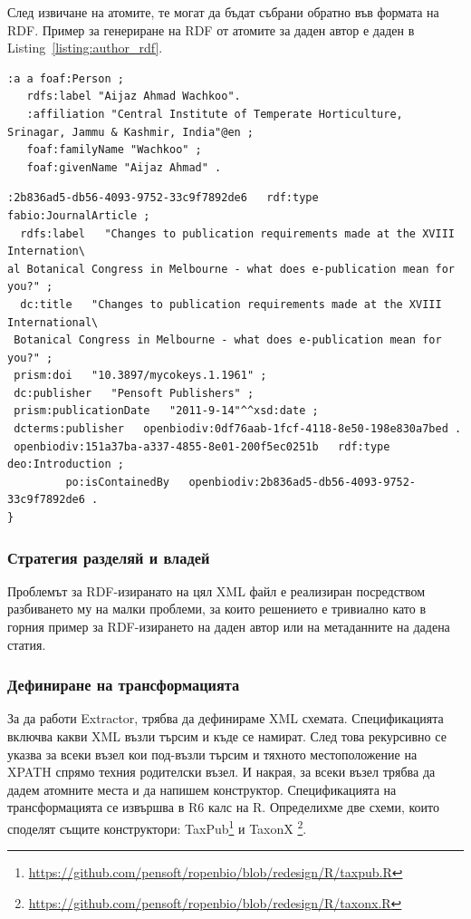 След извичане на атомите, те могат да бъдат събрани обратно във формата на RDF.  Пример за генериране на RDF от атомите за даден автор е даден в Listing~\ref{listing:author_rdf}.

\begin{lstlisting}[language=SPARQL,label=listing:author_rdf, caption=RDF за автор на статия., basicstyle=\ttfamily\tiny]
:a a foaf:Person ;
   rdfs:label "Aijaz Ahmad Wachkoo".
   :affiliation "Central Institute of Temperate Horticulture, Srinagar, Jammu & Kashmir, India"@en ;
   foaf:familyName "Wachkoo" ;
   foaf:givenName "Aijaz Ahmad" .
\end{lstlisting}

\begin{lstlisting}[language=SPARQL,
caption=Пример за RDF на метаданните на статия., label=listing:parent-node-rdf, basicstyle=\ttfamily\tiny]
:2b836ad5-db56-4093-9752-33c9f7892de6   rdf:type   fabio:JournalArticle ;
  rdfs:label   "Changes to publication requirements made at the XVIII Internation\
al Botanical Congress in Melbourne - what does e-publication mean for you?" ;
  dc:title   "Changes to publication requirements made at the XVIII International\
 Botanical Congress in Melbourne - what does e-publication mean for you?" ;
 prism:doi   "10.3897/mycokeys.1.1961" ;
 dc:publisher   "Pensoft Publishers" ;
 prism:publicationDate   "2011-9-14"^^xsd:date ;
 dcterms:publisher   openbiodiv:0df76aab-1fcf-4118-8e50-198e830a7bed .
 openbiodiv:151a37ba-a337-4855-8e01-200f5ec0251b   rdf:type   deo:Introduction ;
         po:isContainedBy   openbiodiv:2b836ad5-db56-4093-9752-33c9f7892de6 .
}
\end{lstlisting}

\subsubsection{Стратегия разделяй и владей}

Проблемът за RDF-изиранато на цял XML файл е реализиран посредством разбиването му на малки проблеми, за които решението е тривиално като в горния пример за RDF-изирането на даден автор или на метаданните на дадена статия.

\subsubsection{Дефиниране на трансформацията}

За да работи Extractor, трябва да дефинираме XML схемата. Спецификацията включва какви XML възли търсим и къде се намират. След това рекурсивно се указва за всеки възел кои под-възли търсим и тяхното местоположение на XPATH спрямо техния родителски възел. И накрая, за всеки възел трябва да дадем атомните места и да напишем конструктор. Спецификацията на трансформацията се извършва в R6 калс на R. Определихме две схеми, които споделят същите конструктори: TaxPub\footnote{\url{https://github.com/pensoft/ropenbio/blob/redesign/R/taxpub.R}} и TaxonX \footnote{\url{https://github.com/pensoft/ropenbio/blob/redesign/R/taxonx.R}}.

